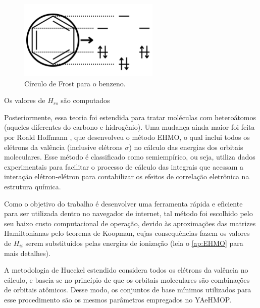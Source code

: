 \begin{figure}[htb]
	\caption{\label{fig:M1} Círculo de Frost para o benzeno.}
	\begin{center}
		\includegraphics[width=0.60\textwidth]{images/figM.png}
	\end{center}
\end{figure}

Os valores de $H_{rs}$ são computados 


Posteriormente, essa teoria foi estendida para tratar moléculas com heteroátomos (aqueles diferentes do carbono e hidrogênio)\autocite{Liwschitz1963}. Uma mudança ainda maior foi feita por Roald Hoffmann \autocite{Hoffmann1963}, que desenvolveu o método \gls{EHMO}, o qual inclui todos os elétrons da valência (inclusive elétrons $\sigma$) no cálculo das energias dos orbitais moleculares. Esse método é classificado como semiempírico, ou seja, utiliza dados experimentais para facilitar o processo de cálculo das integrais que acessam a interação elétron-elétron para contabilizar os efeitos de correlação eletrônica na estrutura química.

Como o objetivo do trabalho é desenvolver uma ferramenta rápida e eficiente para ser utilizada dentro no navegador de internet, tal método foi escolhido pelo seu baixo custo computacional de operação, devido às aproximações das matrizes Hamiltonianas pelo teorema de Koopman, cujas consequências fazem os valores de $H_{ii}$ serem substituídos pelas energias de ionização (leia o \autoref{ap:EHMO} para mais detalhes).

A metodologia de Hueckel estendido considera todos os elétrons da valência no cálculo, e baseia-se no princípio de que os orbitais moleculares são combinações de orbitais atômicos. Desse modo, os conjuntos de base mínimos utilizados para esse procedimento são os mesmos parâmetros empregados no \gls{YAeHMOP}\autocite{Avery2017}. 

